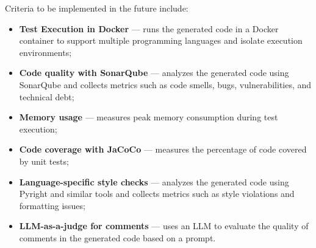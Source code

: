 Criteria to be implemented in the future include:
\begin{itemize}
    \item \textbf{Test Execution in Docker} --- runs the generated code in a Docker container to support multiple programming languages and isolate execution environments;
    \item \textbf{Code quality with SonarQube} --- analyzes the generated code using SonarQube and collects metrics such as code smells, bugs, vulnerabilities, and technical debt;
    \item \textbf{Memory usage} --- measures peak memory consumption during test execution;
    \item \textbf{Code coverage with JaCoCo} --- measures the percentage of code covered by unit tests;
    \item \textbf{Language-specific style checks} --- analyzes the generated code using Pyright and similar tools and collects metrics such as style violations and formatting issues;
    \item \textbf{LLM-as-a-judge for comments} --- uses an LLM to evaluate the quality of comments in the generated code based on a prompt.
\end{itemize}

